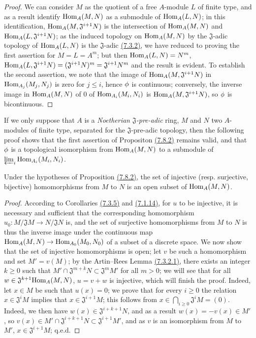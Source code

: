 \begin{proof}
\label{proof-0.7.8.2}
We can consider $M$ as the quotient of a free $A$-module $L$ of finite type, and as a result
identify ${\mathop{\mathrm{Hom}}\nolimits}_A(M,N)$ as a submodule of ${\mathop{\mathrm{Hom}}\nolimits}_A(L,N)$; in this identification,
${\mathop{\mathrm{Hom}}\nolimits}_A(M,\mathfrak{J}^{i+1}N)$ is the intersection of ${\mathop{\mathrm{Hom}}\nolimits}_A(M,N)$ and
${\mathop{\mathrm{Hom}}\nolimits}_A(L,\mathfrak{J}^{i+1}N)$; as the induced topology on ${\mathop{\mathrm{Hom}}\nolimits}_A(M,N)$ by the $\mathfrak{J}$-adic
topology of ${\mathop{\mathrm{Hom}}\nolimits}_A(L,N)$ is the $\mathfrak{J}$-adic \hyperref[0.7.3.2]{(7.3.2)}, we have
reduced to proving the first assertion
for $M=L=A^m$; but then ${\mathop{\mathrm{Hom}}\nolimits}_A(L,N)=N^m$,
${\mathop{\mathrm{Hom}}\nolimits}_A(L,\mathfrak{J}^{i+1}N)=(\mathfrak{J}^{i+1}N)^m=\mathfrak{J}^{i+1}N^m$ and the result is
evident. To establish the second assertion, we note that the image of ${\mathop{\mathrm{Hom}}\nolimits}_A(M,\mathfrak{J}^{i+1}N)$
in ${\mathop{\mathrm{Hom}}\nolimits}_{A_j}(M_j,N_j)$ is zero for $j\leqslant i$, hence $\phi$ is continuous; conversely, the
inverse image in ${\mathop{\mathrm{Hom}}\nolimits}_A(M,N)$ of $0$ of ${\mathop{\mathrm{Hom}}\nolimits}_{A_i}(M_i,N_i)$ is ${\mathop{\mathrm{Hom}}\nolimits}_A(M,\mathfrak{J}^{i+1}N)$,
so $\phi$ is bicontinuous.
\end{proof}

If we only suppose that $A$ is a {\em Noetherian $\mathfrak{J}$-pre-adic} ring, $M$ and $N$ two
$A$-modules of finite type, separated for the $\mathfrak{J}$-pre-adic topology, then the
following proof shows that the first assertion of Propositon \hyperref[0.7.8.2]{(7.8.2)} remains
valid, and that $\phi$ is a topological isomorphism from ${\mathop{\mathrm{Hom}}\nolimits}_A(M,N)$ to a submodule of
$\varprojlim_i{\mathop{\mathrm{Hom}}\nolimits}_{A_i}(M_i,N_i)$.

\begin{prop}[7.8.3]
\label{0.7.8.3}
Under the hypotheses of Proposition \hyperref[0.7.8.2]{(7.8.2)}, the set of injective
(resp. surjective, bijective) homomorphisms from $M$ to $N$ is an open subset of ${\mathop{\mathrm{Hom}}\nolimits}_A(M,N)$.
\end{prop}

\begin{proof}
\label{proof-0.7.8.3}
According to Corollaries \hyperref[0.7.3.5]{(7.3.5)} and \hyperref[0.7.1.14]{(7.1.14)}, for
$u$ to be injective, it is necessary and sufficient that the corresponding homomorphism
$u_0:M/\mathfrak{J}M\to N/\mathfrak{J}N$ is, and the set of surjective homomorphisms from $M$ to $N$
is thus the inverse image under the continuous map ${\mathop{\mathrm{Hom}}\nolimits}_A(M,N)\to{\mathop{\mathrm{Hom}}\nolimits}_{A_0}(M_0,N_0)$ of a subset
of a discrete space. We now show that the set of injective homomorphisms is open; let $v$ be such a
homomorphism and set $M'=v(M)$; by the Artin--Rees Lemma \hyperref[0.7.3.2.1]{(7.3.2.1)}, there exists
an integer $k\geqslant 0$ such that $M'\cap\mathfrak{J}^{m+k}N\subset\mathfrak{J}^m M'$ for all
$m>0$; we will see that for all $w\in\mathfrak{J}^{k+1}{\mathop{\mathrm{Hom}}\nolimits}_A(M,N)$, $u=v+w$ is injective, which
will finish the proof. Indeed, let $x\in M$ be such that $u(x)=0$; we prove that for every
$i\geqslant 0$ the relation $x\in\mathfrak{J}^i M$ implies that $x\in\mathfrak{J}^{i+1}M$; this
follows from $x\in\bigcap_{i\geqslant 0}\mathfrak{J}^i M=(0)$. Indeed, we then have
$w(x)\in\mathfrak{J}^{i+k+1}N$, and as a result $w(x)=-v(x)\in M'$, so
$v(x)\in M'\cap\mathfrak{J}^{i+k+1}N\subset\mathfrak{J}^{i+1}M'$, and as $v$ is an isomorphism from
$M$ to $M'$, $x\in\mathfrak{J}^{i+1}M$; q.e.d.
\end{proof}

